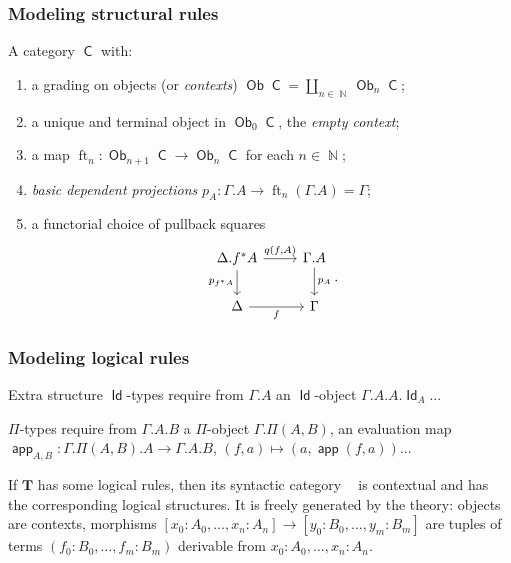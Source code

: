 \documentclass{beamer}
\DeclareMathOperator{\Id}{\mathsf{Id}}
\DeclareMathOperator{\sfC}{\mathsf{C}}
\DeclareMathOperator{\N}{\mathbb{N}}
\DeclareMathOperator{\Ob}{\mathsf{Ob}}
\DeclareMathOperator{\ft}{ft}
\DeclareMathOperator{\app}{\mathsf{app}}
\DeclareMathOperator{\Syn}{\mathsf{Syn}(\mathbf{T})}
\begin{document}
\begin{frame}
  \frametitle{Modeling structural rules}

  \begin{definition}
    A category $\sfC$ with:
    \begin{enumerate}
      \item a grading on objects (or \emph{contexts}) $\Ob\sfC=\coprod_{n\in\N}\Ob_n\sfC$;
      \item a unique and terminal object in $\Ob_0\sfC$, the \emph{empty context};
      \item a map $\ft_n\colon\Ob_{n+1}\sfC\rightarrow\Ob_n\sfC$ for each
        $n\in\N$;
      \item \emph{basic dependent projections}
        $p_A\colon\Gamma.A\rightarrow\ft_n(\Gamma.A)=\Gamma$;
      \item a functorial choice of pullback squares
        \[\begin{tikzcd}[ampersand replacement=\&]
          {\Delta.f^*A} \& {\Gamma.A} \\
          \Delta \& \Gamma
          \arrow["{p_A}", from=1-2, to=2-2]
          \arrow["{p_{f^*A}}"', from=1-1, to=2-1]
          \arrow["{q(f,A)}", from=1-1, to=1-2]
          \arrow["f"', from=2-1, to=2-2]
        \end{tikzcd}.\]
    \end{enumerate}
  \end{definition}
\end{frame}

\begin{frame}
  \frametitle{Modeling logical rules}

  \begin{block}{Extra structure}
    $\Id$-types require from $\Gamma.A$ an $\Id$-object $\Gamma.A.A.\Id_A$...
    
    $\Pi$-types require from $\Gamma.A.B$ a $\Pi$-object $\Gamma.\Pi(A,B)$, an
    evaluation map $\app_{A,B}\colon\Gamma.\Pi(A,B).A\rightarrow\Gamma.A.B$,
    $(f,a)\mapsto(a,\app(f,a))$...
  \end{block}
  \pause

  \begin{example}
    If $\mathbf{T}$ has some logical rules, then its syntactic category $\Syn$
    is contextual and has the corresponding logical structures. It is freely
    generated by the theory: objects are contexts, morphisms
    $[x_0:A_0,\ldots,x_n:A_n]\rightarrow[y_0:B_0,\ldots,y_m:B_m]$ are
    tuples of terms $(f_0:B_0,\ldots,f_m:B_m)$ derivable from
    $x_0:A_0,\ldots,x_n:A_n$.
  \end{example}
\end{frame}
\end{document}
